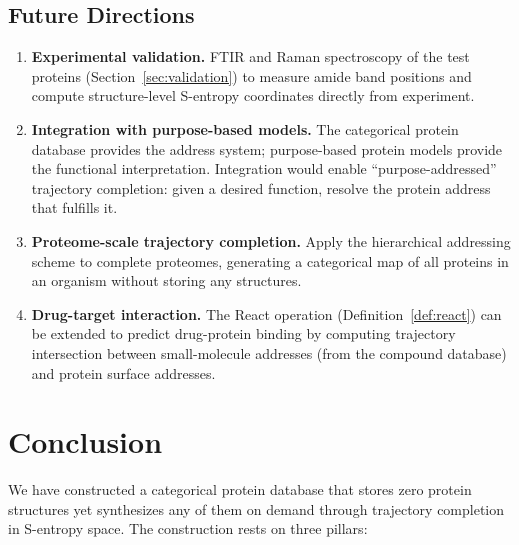 \documentclass[11pt,twocolumn,a4paper]{article}
\theoremstyle{definition}
\theoremstyle{remark}
\begin{document}
\subsection{Future Directions}

\begin{enumerate}[nosep]
\item \textbf{Experimental validation.} FTIR and Raman spectroscopy of the test proteins (Section~\ref{sec:validation}) to measure amide band positions and compute structure-level S-entropy coordinates directly from experiment.

\item \textbf{Integration with purpose-based models.} The categorical protein database provides the address system; purpose-based protein models \citep{sachikonye2025c} provide the functional interpretation. Integration would enable ``purpose-addressed'' trajectory completion: given a desired function, resolve the protein address that fulfills it.

\item \textbf{Proteome-scale trajectory completion.} Apply the hierarchical addressing scheme to complete proteomes, generating a categorical map of all proteins in an organism without storing any structures.

\item \textbf{Drug-target interaction.} The React operation (Definition~\ref{def:react}) can be extended to predict drug-protein binding by computing trajectory intersection between small-molecule addresses (from the compound database) and protein surface addresses.
\end{enumerate}

\section{Conclusion}
\label{sec:conclusion}

We have constructed a categorical protein database that stores zero protein structures yet synthesizes any of them on demand through trajectory completion in S-entropy space. The construction rests on three pillars:
\end{document}
